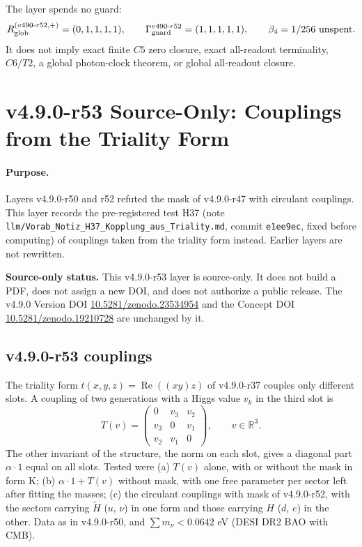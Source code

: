 The layer spends no guard:
\[
R_{\rm glob}^{(v490\text{-}r52,+)}=(0,1,1,1,1),
\qquad
\Gamma_{\rm guard}^{v490\text{-}r52}=(1,1,1,1,1),
\qquad
\beta_4=1/256\ \text{unspent}.
\]
It does not imply exact finite \(C5\) zero closure, exact all-readout terminality,
\(C6/T2\), a global photon-clock theorem, or global all-readout closure.

\clearpage
\section*{v4.9.0-r53 Source-Only: Couplings from the Triality Form}
\label{sec:v490-r53-triality-couplings}

\paragraph{Purpose.}
Layers v4.9.0-r50 and r52 refuted the mask of v4.9.0-r47 with circulant couplings.  This layer records the pre-registered test H37 (note
\texttt{llm/Vorab\_Notiz\_H37\_Kopplung\_aus\_Triality.md}, commit \texttt{e1ee9ec}, fixed before computing) of couplings taken from the triality form
instead.  Earlier layers are not rewritten.

\noindent\textbf{Source-only status.}
This v4.9.0-r53 layer is source-only.  It does not build a PDF, does not assign a new DOI,
and does not authorize a public release.  The v4.9.0 Version DOI
\href{https://doi.org/10.5281/zenodo.23534954}{10.5281/zenodo.23534954} and the Concept DOI
\href{https://doi.org/10.5281/zenodo.19210728}{10.5281/zenodo.19210728} are unchanged by it.

\subsection*{v4.9.0-r53 couplings}
\label{subsec:v490-r53-couplings}

The triality form \(t(x,y,z)=\operatorname{Re}((xy)z)\) of v4.9.0-r37 couples only different slots.  A coupling of two generations with a Higgs value
\(v_k\) in the third slot is
\[
T(v)=\begin{pmatrix}0&v_3&v_2\\v_3&0&v_1\\v_2&v_1&0\end{pmatrix},\qquad v\in\mathbb R^3 .
\]
The other invariant of the structure, the norm on each slot, gives a diagonal part \(\alpha\cdot1\) equal on all slots.  Tested were (a) \(T(v)\)
alone, with or without the mask in form K; (b) \(\alpha\cdot1+T(v)\) without mask, with one free parameter per sector left after fitting the
masses; (c) the circulant couplings with mask of v4.9.0-r52, with the sectors carrying \(\tilde H\) (\(u\), \(\nu\)) in one form and those
carrying \(H\) (\(d\), \(e\)) in the other.  Data as in v4.9.0-r50, and \(\sum m_\nu<0.0642\) eV (DESI DR2 BAO with CMB).

